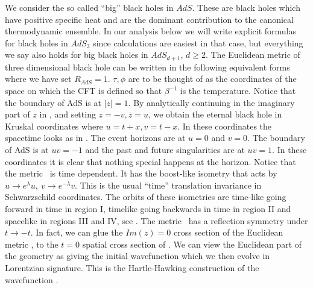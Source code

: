 We  consider the so called ``big'' black holes
in $AdS$. These are black holes which have positive specific heat and are
the dominant contribution to the 
 canonical thermodynamic   ensemble.
In our analysis below we will write explicit formulas for 
 black holes in   $AdS_3$ since calculations are easiest in that case,
 but everything we say also holds for big black 
holes in 
$AdS_{d+1}$, $d\geq 2$. 
The Euclidean metric of three dimensional 
 black hole can be written in the 
following equivalent forms \btzpaper\ 
\eqn{}
where we have set $R_{AdS} = 1$. $\tau, \phi$ are to 
be thought of as the coordinates of the space on which the CFT is defined
so that $\beta^{-1} $ is the temperature. Notice that the boundary of AdS
is at $|z|=1$.
By analytically continuing in the imaginary   part of $z$ in \btzmet ,
and
setting $z = -v  , \bar z = u  $,  we 
obtain the eternal black hole in Kruskal coordinates 
\eqn\kruskalcoord{
ds^2 = { - 4 du dv \over (1 + uv)^2 } + {(1 - uv)^2 \over (1 + uv)^2 } 
d \tilde \phi^2 }  
where $u = t + x , v = t - x$. 
In these  coordinates the spacetime looks as in  \kruskal . 
The event horizons are at $u=0$ and $v=0$. The boundary of AdS is
at $uv=-1$ and the past and future singularities are at $uv = 1$. 
In these coordinates it is clear that nothing special happens at the
horizon. 
Notice that the metric \kruskalcoord\ is time dependent. It has 
the boost-like isometry that acts by $ u \to e^\lambda u, ~
v\to   e^{-\lambda}v $. This is the usual ``time'' translation invariance
in Schwarzschild coordinates. The orbits of these isometries are time-like
going forward in time in region I, timelike going backwards in time
in region II and spacelike in regions III and IV, see  \penrose . 
The metric \kruskalcoord\ has a reflection symmetry under $t \to -t$. 
In fact,  we can glue the $Im(z)=0$ cross section of the Euclidean metric
\btzmet , to the $t=0$ spatial cross section of \kruskalcoord . 
We can view the Euclidean part of the geometry as giving the initial
wavefunction which we then evolve in Lorentzian signature. This is 
the Hartle-Hawking construction of the wavefunction \hh .


